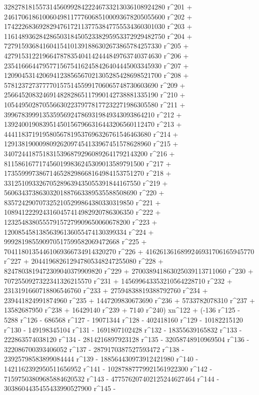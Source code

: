        3282781815573145609928422246733213036108924280 r^201 + 
       2461706186100604981177760685100093678205055600 r^202 + 
       1742226836928294761721137753847755534360301030 r^203 + 
       1161489362842865031845052338295953372929482750 r^204 + 
       727915936841604154101391886302673865784257330 r^205 + 
       427915312219664787835404142444849763740374630 r^206 + 
       235416664479577156754162458426404445003345930 r^207 + 
       120904531420694123856567021305285428698521700 r^208 + 
       57812372737777015751455991706065748730603690 r^209 + 
       25664520832469148282865117990142738881335190 r^210 + 
       10544950287055663022379778177232271986305580 r^211 + 
       3996783999135359569247869319849343093864210 r^212 + 
       1392400190839514501567966316443206560112470 r^213 + 
       444118371919580567819537696326761546463680 r^214 + 
       129138190009809262097454133967451578628960 r^215 + 
       34072441875183153968792960892641792143200 r^216 + 
       8115861677174560199836245309013589791500 r^217 + 
       1735599973867146528298668164984153751270 r^218 + 
       331251093326705289639435055391844167550 r^219 + 
       56063437386303201887663389535588508690 r^220 + 
       8357242907073252105299864380330319850 r^221 + 
       1089412229243160457414982920786306350 r^222 + 
       123254838055579157279909650060678200 r^223 + 
       12008545813856396136055474130399334 r^224 + 
       999281985590970517599582069472668 r^225 + 
       70411801354461069366734914320270 r^226 + 
       4162613616899246931706165945770 r^227 + 
       204419682612947805348247255080 r^228 + 
       8247803819472309040379909820 r^229 + 
       270038941863025039113711060 r^230 + 
       7072550927322341326215570 r^231 + 
       145699643353210564228710 r^232 + 
       2313191660718806546760 r^233 + 27594838819388792760 r^234 + 
       239441824991874960 r^235 + 1447209830673690 r^236 + 
       5733782078310 r^237 + 13582687950 r^238 + 16429140 r^239 + 
       7140 r^240) xn^122 + (-136 r^125 - 5288 r^126 - 686568 r^127 - 
       19071344 r^128 - 402418160 r^129 - 10182215120 r^130 - 
       149198345104 r^131 - 1691807102428 r^132 - 
       18355639165832 r^133 - 222863574038120 r^134 - 
       2814216897923128 r^135 - 32058748910969504 r^136 - 
       322086700393406052 r^137 - 2879170387527593472 r^138 - 
       23925798583899084444 r^139 - 188564430973912421980 r^140 - 
       1421162392950511656952 r^141 - 10287887779921561922300 r^142 - 
       71597503809685884620532 r^143 - 
       477576207402125244627464 r^144 - 
       3038604435455433990527900 r^145 - 
